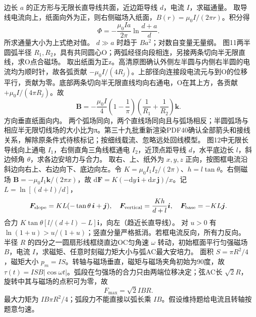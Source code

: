 \problemtext 边长 $a$ 的正方形与无限长直导线共面，近边距导线 $d$，电流 $I$，求磁通量。
\workings 取导线电流向上，纸面向外为正，则右侧磁场入纸面，$B(r)=\mu_0 I/(2\pi r)$。积分得
\[
\Phi=-\frac{\mu_0 Ia}{2\pi}\ln\frac{d+a}{d}.
\]
所求通量大小为上式绝对值。
\crosscheck $d\gg a$ 时趋于 $Ba^2$；对数自变量无量纲。
\problemtext 图11两半圆弧半径 $R_1,R_2$，具有共同圆心O；两弧经径向段相连，另接两条切向半无限直线，求O点合磁场。
\workings 取出纸面为正z。高清原图确认外侧左半圆与内侧右半圆的电流均为顺时针，故各弧贡献 $-\mu_0 I/(4R_j)$。上部径向连接段电流元与到O的位移平行，贡献为零。底部两条切向半无限直线均向右通电，O在其上方，各贡献 $+\mu_0 I/(4\pi R_j)$。故
\[
\bm B=-\frac{\mu_0 I}{4}\left(1-\frac1\pi\right)
\left(\frac1{R_1}+\frac1{R_2}\right)\bm k .
\]
方向垂直纸面向内。
\crosscheck 两个弧场同向，两个直线场同向且与弧场相反；半圆弧场与相应半无限切线场的大小比为π。第三十九批重新渲染PDF40确认全部箭头和接线关系，解除原条件式待核标记；按细线载流、忽略远处回线模型。
\problemtext 图12中无限长导线向上通电 $I_1$，右侧直角三角线框通电 $I_2$，近顶点距导线 $d$，水平底边长 $l$，斜边倾角 $\theta$，求各边安培力与合力。
\workings 取右、上、纸外为 $x,y,z$ 正向，按图框电流沿斜边向右上、右边向下、底边向左。令 $K=\mu_0 I_1I_2/(2\pi)$、$h=l\tan\theta$。右侧磁场 $\bm B=-\mu_0 I_1\bm k/(2\pi x)$，故 $\mathrm d\bm F=K(-\mathrm dy\,\bm i+\mathrm dx\,\bm j)/x$。记 $L=\ln[(d+l)/d]$，
\[
\bm F_{\rm slope}=KL(-\tan\theta\,\bm i+\bm j),\quad
\bm F_{\rm vertical}=\frac{Kh}{d+l}\bm i,\quad
\bm F_{\rm base}=-KL\bm j.
\]
合力 $K\tan\theta[l/(d+l)-L]\bm i$，向左（趋近长直导线）。
\crosscheck 对 $u>0$ 有 $\ln(1+u)>u/(1+u)$；竖直分量严格抵消。若框电流反向，所有力反向。
\problemtext 半径 $R$ 的四分之一圆扇形线框绕直边OC匀角速 $\omega$ 转动，初始框面平行匀强磁场 $B$，电流 $I$，求磁矩、任意时刻磁力矩大小与弧AC最大安培力。
\workings 面积 $S=\pi R^2/4$，磁矩大小 $p_m=IS$。转轴与磁场垂直，磁矩与磁场夹角初始为90度，故 $\tau(t)=ISB|\cos\omega t|$。弧段在匀强场的合力只由两端位移决定；弦AC长 $\sqrt2R$，旋转中其与磁场的点积可为零，故
\[
F_{\max}=\sqrt2IBR .
\]
\crosscheck 最大力矩为 $IB\pi R^2/4$；弧段力不能直接以弧长乘 $IB$。假设维持题给电流且转轴按题意匀速。

